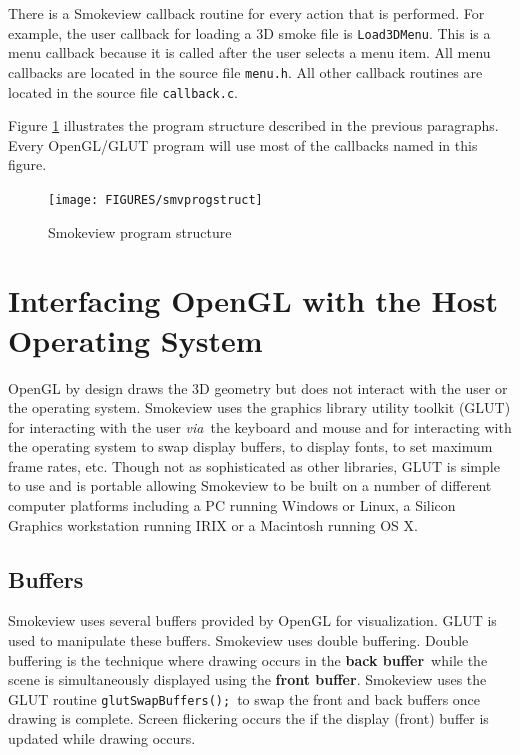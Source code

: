 \documentclass[11pt,twoside]{book}
\begin{document}
There is a Smokeview callback routine for every action that is
performed.  For example, the user callback for loading a 3D smoke
file is {\tt Load3DMenu}.  This is a menu callback because it is
called after the user selects a menu item.  All menu callbacks are
located in the source file {\tt menu.h}.  All other callback
routines are located in the source file {\tt callback.c}.

Figure \ref{figprogstruct} illustrates the program structure
described in the previous paragraphs.  Every OpenGL/GLUT program
will use most of the callbacks named in this figure.

\begin{figure}
\begin{center}
\texttt{[image: FIGURES/smvprogstruct]}
\end{center}
\caption{Smokeview program structure}
\label{figprogstruct}
\end{figure}

%
%

\chapter{Interfacing OpenGL with the Host Operating System}
\label{openglinterface}
OpenGL by design draws the 3D geometry but
does not interact with the user or the operating system. Smokeview
uses the graphics library utility toolkit (GLUT) for interacting
with the user {\em via}\ the keyboard and mouse and for
interacting with the operating system to swap display buffers, to
display fonts, to set maximum frame rates, etc. Though not as
sophisticated as other libraries, GLUT is simple to use and is
portable allowing Smokeview to be built on a number of different
computer platforms including a PC running Windows or Linux, a
Silicon Graphics workstation running IRIX or a Macintosh running
OS X.

%
%

\section{Buffers} Smokeview uses several buffers provided by
OpenGL for visualization.  GLUT is used to manipulate these
buffers. Smokeview uses double buffering.  Double buffering is the
technique where drawing occurs in the {\bf back buffer}\ while the
scene is simultaneously displayed using the {\bf front buffer}.
Smokeview uses the GLUT routine {\tt glutSwapBuffers();}\ to swap
the front and back buffers once drawing is complete. Screen
flickering occurs the if the display (front) buffer is updated
while drawing occurs.
\end{document}
